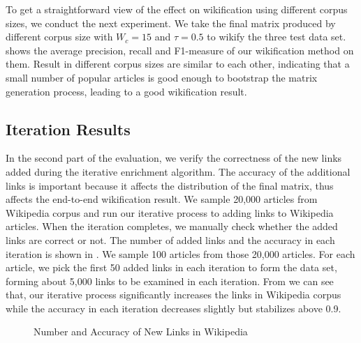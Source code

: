 To get a straightforward view of the effect on wikification using
different corpus sizes, we conduct the next experiment. We take the
final matrix produced by different corpus size with $W_c = 15$ and
$\tau = 0.5$ to wikify
the three test data set.  shows the average
precision, recall and F1-measure of our wikification method on them.
Result in different corpus sizes are similar to each other, indicating
that a small number of popular articles is good enough to %
bootstrap the matrix generation process, leading to a good wikification result.

\subsection{Iteration Results}
In the second part of the evaluation, we verify the correctness of the new links
added during the iterative enrichment algorithm.
The accuracy of the additional links is important because it affects the
distribution of the final matrix, thus affects the end-to-end wikification result.
We sample 20,000 articles from Wikipedia corpus and run our iterative process
to adding links to Wikipedia articles. When the iteration completes,
we manually check whether the added links are correct or not. The number of
added links and the accuracy in each iteration is shown in .
We sample 100 articles from those 20,000 articles. For each article, we pick
the first 50 added links in each iteration to form the data set,
forming about 5,000 links to be examined in each iteration.
From  we can see that, our iterative process
significantly increases the links in Wikipedia corpus while the accuracy
in each iteration decreases slightly but stabilizes above 0.9.

\begin{figure}[th]
\centering
{}
\caption{Number and Accuracy of New Links in Wikipedia}
\label{fig:2wlink}
\end{figure}


